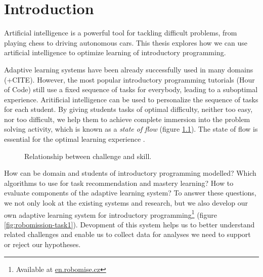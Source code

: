 \chapter{Introduction}
\label{chap:introduction}

Artificial intelligence is a powerful tool for tackling difficult problems,
from playing chess to driving autonomous cars.
This thesis explores how we can use artificial intelligence to optimize
learning of introductory programming.

Adaptive learning systems have been already successfully used in many domains
\cite{alg.evaluation-geography} (+CITE).
However, the most popular introductory programming tutorials
(Hour of Code) still use a fixed sequence of tasks for everybody,
leading to a suboptimal experience.
Aritificial intelligence can be used to personalize the sequence of tasks
for each student.
By giving students tasks of optimal difficulty, neither too easy, nor too
difficult, we help them to achieve complete immersion into the problem solving
activity, which is known as a \emph{state of flow} \cite{flow}
(figure \ref{fig:flow}).
The state of flow is essential for the optimal learning experience
\cite{adaptive-practice}.

\begin{figure}[htb]
  \centering
  \caption{Relationship between challenge and skill.}
  \label{fig:flow}
\end{figure}


How can be domain and students of introductory programming modelled?
Which algorithms to use for task recommendation and mastery learning?
How to evaluate components of the adaptive learning system?
To answer these questions, we not only look at the existing systems
and research, but we also develop our own adaptive learning system for
introductory programming\footnote{Available at \url{en.robomise.cz}}
(figure \ref{fig:robomission-task1}).
Devopment of this system helps us to better understand related challenges
and enable us to collect data for analyses we need to support or reject our hypotheses.

